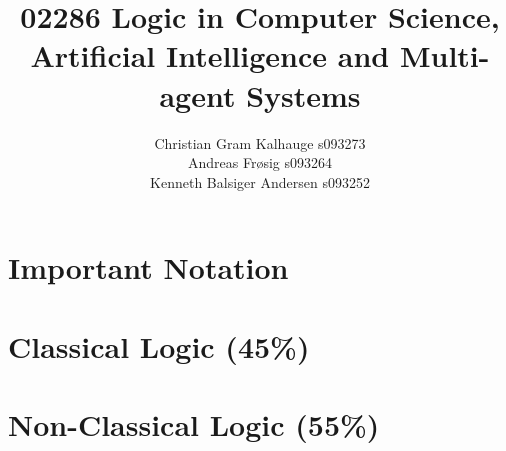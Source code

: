 \documentclass[a4paper,11pt]{article}
\title{02286 Logic in Computer Science, Artificial Intelligence and Multi-agent Systems }
\author{
Christian Gram Kalhauge s093273 \\
Andreas Frøsig s093264 \\
Kenneth Balsiger Andersen s093252
}
\begin{document}
\maketitle

\part{Important Notation}



\part{Classical Logic (45\%)}




\part{Non-Classical Logic (55\%)}

\nocite{*}



\end{document}
